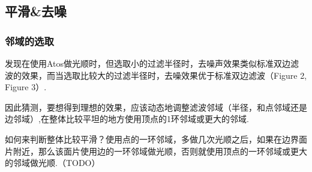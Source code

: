\documentclass{article}
\theoremstyle{definition}
\theoremstyle{remark}
\begin{document}
\subsection{平滑\&去噪}
\subsubsection{邻域的选取}
发现在使用Atos做光顺时，但选取小的过滤半径时，去噪声效果类似标准双边滤波的效果，而当选取比较大的过滤半径时，去噪效果优于标准双边滤波（Figure 2, Figure 3）.\par
 因此猜测，要想得到理想的效果，应该动态地调整滤波邻域（半径，和点邻域还是边邻域）,在整体比较平坦的地方使用顶点的1环邻域或更大的邻域.\par
如何来判断整体比较平滑？使用点的一环邻域，多做几次光顺之后，如果在边界面片附近，那么该面片使用边的一环邻域做光顺，否则就使用顶点的一环邻域或更大的邻域做光顺.（TODO）
\end{document}
